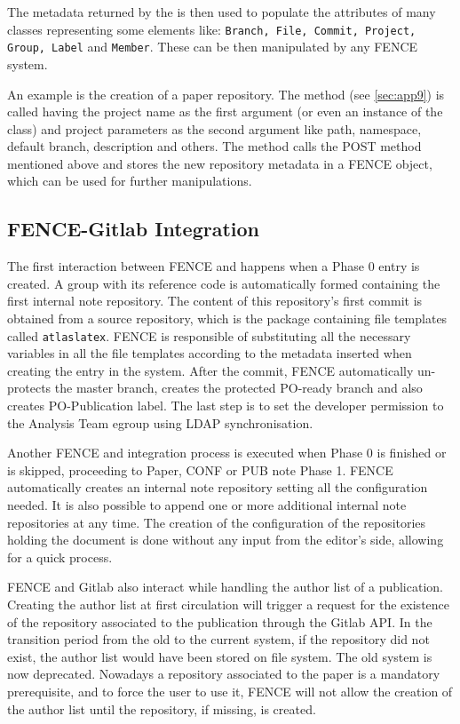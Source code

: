 The metadata returned by the  is then used to populate the attributes of many classes representing some \gitlab elements like:
\texttt{Branch, File, Commit, Project, Group, Label} and \texttt{Member}.
These can be then manipulated by any FENCE system.

An example is the creation of a paper repository.
The  method (see \cref{sec:app9}) is called having the project name as the first argument (or even an instance of the  class) and project parameters as the second argument like path, namespace, default branch, description and others.
The method calls the POST method mentioned above and stores the new repository metadata in a FENCE  object, which can be used for further manipulations.



\subsection{FENCE-Gitlab Integration}%
\label{sec:FENCE-Gitlab_Integration}
The first interaction between FENCE and \gitlab happens when a Phase 0 entry is created.
A group with its reference code is automatically formed containing the first internal note repository.
The content of this repository’s first commit is obtained from a source repository,
which is the package containing file templates called \texttt{atlaslatex}.
FENCE is responsible of substituting all the necessary variables in all the file templates according to the metadata inserted when creating the entry in the system. After the commit, FENCE automatically un-protects the master branch, creates the protected PO-ready branch and also creates PO-Publication label. The last step is to set the developer permission to the Analysis Team egroup using LDAP synchronisation.

Another FENCE and \gitlab integration process is executed when Phase 0 is finished or is skipped, proceeding to Paper, CONF or PUB note Phase 1.
FENCE automatically creates an internal note repository setting all the configuration needed.
It is also possible to append one or more additional internal note repositories at any time.
The creation of the configuration of the repositories holding the document is done without any input from the editor’s side, allowing for a quick process.

FENCE and Gitlab also interact while handling the author list of a publication.
Creating the author list at first circulation will trigger a request for the existence of the \gitlab repository associated to the publication through the Gitlab API\@.
In the transition period from the old to the current system,
if the repository did not exist, the author list would have been stored on  file system.
The old system is now deprecated.
Nowadays a \gitlab repository associated to the paper is a mandatory prerequisite, and to force the user to use it,
FENCE will not allow the creation of the author list until the repository, if missing, is created.

